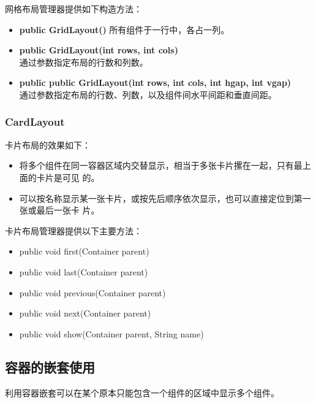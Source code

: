 网格布局管理器提供如下构造方法：

\begin{itemize}\kai
\item {\bf public GridLayout()}  所有组件于一行中，各占一列。
\item {\bf public GridLayout(int rows, int cols)}\\
  通过参数指定布局的行数和列数。
\item {\bf public public GridLayout(int rows, int cols, int hgap, int vgap)}\\
  通过参数指定布局的行数、列数，以及组件间水平间距和垂直间距。
\end{itemize}


\subsubsection{CardLayout}

卡片布局的效果如下：

\begin{itemize}
\item 将多个组件在同一容器区域内交替显示，相当于多张卡片摞在一起，只有最上面的卡片是可见
  的。
\item 可以按名称显示某一张卡片，或按先后顺序依次显示，也可以直接定位到第一张或最后一张卡
  片。
\end{itemize}

卡片布局管理器提供以下主要方法：

\begin{itemize}
\item public void first(Container parent)
\item public void last(Container parent)
\item public void previous(Container parent)
\item public void next(Container parent)
\item public void show(Container parent, String name)
\end{itemize}

  

\subsection{容器的嵌套使用}

利用容器嵌套可以在某个原本只能包含一个组件的区域中显示多个组件。


